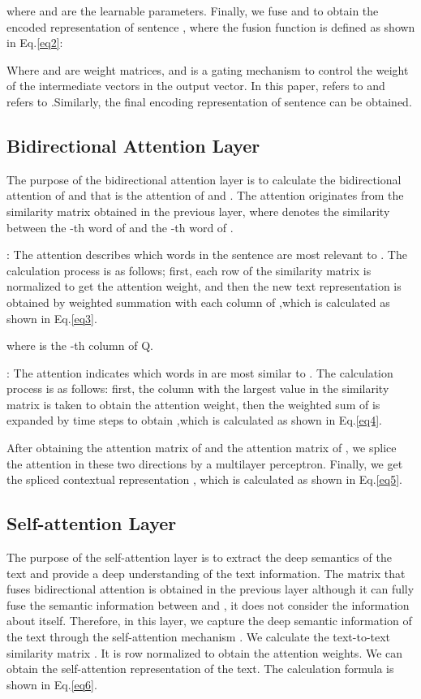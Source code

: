 \documentclass[review]{elsarticle}
\begin{document}
where  and   are the learnable parameters. Finally, we fuse  and  to obtain the encoded representation  of sentence  , where the fusion function is defined as shown in Eq.\ref{eq2}:

Where  and   are weight matrices, and  is a gating mechanism to control the weight of the intermediate vectors in the output vector. In this paper,  refers to  and  refers to .Similarly, the final encoding representation  of sentence  can be obtained.
\subsection{Bidirectional Attention Layer}
The purpose of the bidirectional attention layer is to calculate the bidirectional attention of  and  that is the attention of  and \cite{seo2016bidirectional} . The attention  originates from the similarity matrix \bm{} obtained in the previous layer, where  denotes the similarity between the -th word of  and the -th word of .

: The attention describes which words in the sentence  are most relevant to . The calculation process is as follows; first, each row of the similarity matrix is normalized to get the attention weight, and then the new text representation  is obtained by weighted summation with each column of ,which is calculated as shown in Eq.\ref{eq3}.


where  is the -th column of Q.

: The attention indicates which words in  are most similar to . The calculation process is as follows: first, the column with the largest value in the similarity matrix \bm{} is taken to obtain the attention weight, then the weighted sum of  is expanded by  time steps to obtain ,which is calculated as shown in Eq.\ref{eq4}.


After obtaining the attention matrix  of and the attention matrix  of , we splice the attention in these two directions by a multilayer perceptron. Finally, we get the spliced contextual representation , which is calculated as shown in Eq.\ref{eq5}.

\subsection{Self-attention Layer}
The purpose of the self-attention layer is to extract the deep semantics of the text and provide a deep understanding of the text information. The matrix  that fuses bidirectional attention is obtained in the previous layer although it can fully fuse the semantic information between  and , it does not consider the information about itself. Therefore, in this layer, we capture the deep semantic information of the text through the self-attention mechanism \cite{vaswani2017attention}.  We calculate the text-to-text similarity matrix  . It is row normalized to obtain the attention weights. We can obtain the self-attention representation  of the text. The calculation formula is shown in Eq.\ref{eq6}.
\end{document}
